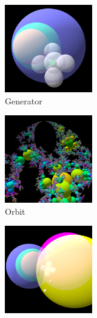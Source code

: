 \begin{figure}[h!tbp]
 \begin{minipage}{0.49\hsize}
  \begin{subfigure}{0.24\textwidth}
   \begin{center}
    \includegraphics[width=1.5in, height=1.5in, keepaspectratio]{../img/klein/3diis/parabolicGen.pdf}
    \caption{Generator}
    \label{fig:parabolicGen3d}
   \end{center}
  \end{subfigure}
 \hspace*{\fill}
 \begin{subfigure}{0.24\textwidth}
  \begin{center}
   \includegraphics[width=1.5in, height=1.5in, keepaspectratio]{../img/klein/3diis/parabolicOrb.pdf}
   \caption{Orbit}
   \label{fig:parabolicOrb3d}
  \end{center}
 \end{subfigure}
  \hspace*{\fill}
  \caption{Parabolic transformation}
  \label{fig:parabolic3d}
 \end{minipage}
 \begin{minipage}{0.49\hsize}
  \begin{subfigure}{0.24\textwidth}
   \begin{center}
    \includegraphics[width=1.5in, height=1.5in, keepaspectratio]{../img/klein/3diis/compLoxoGen.pdf}

\end{center}
\end{subfigure}
\end{minipage}
\end{figure}
